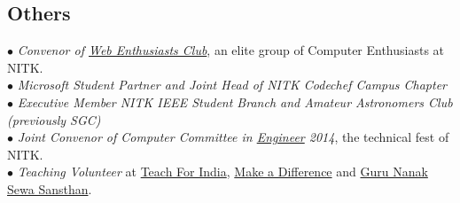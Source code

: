 \documentclass[margin,line]{resume}
\begin{document}
\begin{resume}
    \section{\mysidestyle \bf Others}
 $\bullet$ {\it Convenor of \href{https://webclub-nitk.github.io/}{Web Enthusiasts Club}}, an elite group of Computer Enthusiasts at NITK. \\
 $\bullet$ {\it Microsoft Student Partner and Joint Head of NITK Codechef Campus Chapter} \\
     $\bullet$ {\it Executive Member NITK IEEE Student Branch and Amateur Astronomers Club (previously SGC)} \\
     $\bullet$ {\it Joint Convenor of Computer Committee in \href{http://www.nitk.ac.in/students-activities/engineer}{Engineer} 2014}, the technical fest of NITK. \\
$\bullet$ {\it Teaching Volunteer} at \href{http://www.teachforindia.org/}{Teach For India}, \href{http://makeadiff.in/}{Make a Difference} and \href{https://www.nanakg.org/}{Guru Nanak Sewa Sansthan}. \\


\end{resume}
\end{document}
